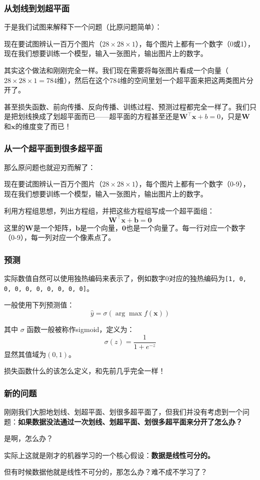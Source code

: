 \documentclass{ctexbeamer}
\begin{document}
\begin{frame}
    \frametitle{从划线到划超平面}

    于是我们试图来解释下一个问题（比原问题简单）：

    现在要试图辨认一百万个图片（$28\times 28 \times 1$），每个图片上都有一个数字（0或1），现在我们想要训练一个模型，输入一张图片，输出图片上的数字。

    其实这个做法和刚刚完全一样。我们现在需要将每张图片看成一个向量（$28\times 28 \times 1 = 784$维），然后在这个784维的空间里划一个超平面来把这两类图片分开了。

    甚至损失函数、前向传播、反向传播、训练过程、预测过程都完全一样了。我们只是把划线换成了划超平面而已——超平面的方程甚至还是$\mathbf{W}^\top \mathbf{x} + b = 0$，只是$\mathbf{W}$和$\mathbf{x}$的维度变了而已！

\end{frame}

\begin{frame}
    \frametitle{从一个超平面到很多超平面}

    那么原问题也就迎刃而解了：

    现在要试图辨认一百万个图片（$28\times 28 \times 1$），每个图片上都有一个数字（0-9），现在我们想要训练一个模型，输入一张图片，输出图片上的数字。

    利用方程组思想，列出方程组，并把这些方程组写成一个超平面组：
    \[\mathbf{W}^\top \mathbf{x} + \mathbf{b} = \mathbf{0}\]
    这里的$\mathbf{W}$是一个矩阵，$\mathbf{b}$是一个向量，$\mathbf{0}$也是一个向量了。每一行对应一个数字（0-9），每一列对应一个像素点了。
\end{frame}

\begin{frame}
    \frametitle{预测}

    实际数值自然可以使用独热编码来表示了，例如数字0对应的独热编码为\texttt{[1, 0, 0, 0, 0, 0, 0, 0, 0, 0]}。

    一般使用下列预测值：
    \[\hat{y} = \sigma(\arg\max f (\mathbf{x}))\]

    其中 $\sigma$ 函数一般被称作sigmoid，定义为：
    \[\sigma( z ) = \frac{1}{1 + e^{-z}}\]
    显然其值域为$(0, 1)$。

    损失函数什么的该怎么定义，和先前几乎完全一样！

\end{frame}

\begin{frame}
    \frametitle{新的问题}

    刚刚我们大胆地划线、划超平面、划很多超平面了，但我们并没有考虑到一个问题：\textbf{如果数据没法通过一次划线、划超平面、划很多超平面来分开了怎么办？}

    是啊，怎么办？

    实际上这就是刚才的机器学习的一个核心假设：\textbf{数据是线性可分的。}

    但有时候数据他就是线性不可分的，那怎么办？难不成不学习了？

\end{frame}
\end{document}
